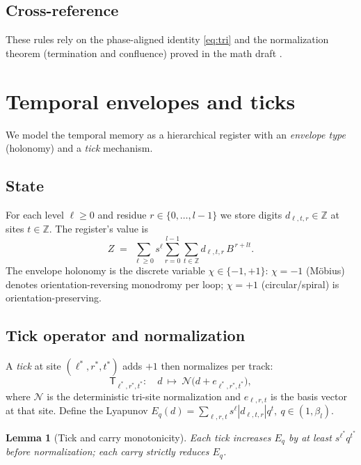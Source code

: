 \documentclass[11pt]{article}
\newtheorem{lemma}[theorem]{Lemma}
\theoremstyle{definition}
\theoremstyle{remark}
\newcommand{\Z}{\mathbb{Z}}
\begin{document}
\subsection*{Cross-reference}
These rules rely on the phase-aligned identity \eqref{eq:tri} and the normalization theorem (termination and confluence) proved in the math draft \cite{VR_AI_ComplexBase}.


\section{Temporal envelopes and ticks}\label{sec:envelopes}
We model the temporal memory as a hierarchical register with an \emph{envelope type} (holonomy) and a \emph{tick} mechanism.

\subsection{State}
For each level $\ell\ge0$ and residue $r\in\{0,\dots,l-1\}$ we store digits $d_{\ell,t,r}\in\Z$ at sites $t\in\Z$.
The register's value is
\begin{equation}
Z \;=\; \sum_{\ell\ge0} s^\ell \sum_{r=0}^{l-1} \sum_{t\in\Z} d_{\ell,t,r}\,B^{\,r+lt}.
\end{equation}
The envelope holonomy is the discrete variable $\chi\in\{-1,+1\}$:
$\chi=-1$ (M\"obius) denotes orientation-reversing monodromy per loop; $\chi=+1$ (circular/spiral) is orientation-preserving.

\subsection{Tick operator and normalization}
A \emph{tick} at site $(\ell^{*},r^{*},t^{*})$ adds $+1$ then normalizes per track:
\begin{equation}
\mathsf{T}_{\ell^{*},r^{*},t^{*}}:\quad d\ \mapsto\ \mathcal N\!\big(d + e_{\ell^{*},r^{*},t^{*}}\big),
\end{equation}
where $\mathcal N$ is the deterministic tri-site normalization and $e_{\ell,r,t}$ is the basis vector at that site.
Define the Lyapunov
\(
E_q(d)=\sum_{\ell,r,t} s^\ell |d_{\ell,t,r}| q^t,\ q\in(1,\beta_l).
\)

\begin{lemma}[Tick and carry monotonicity]
Each tick increases $E_q$ by at least $s^{\ell^{*}} q^{t^{*}}$ before normalization; each carry strictly reduces $E_q$.
\end{lemma}
\end{document}

